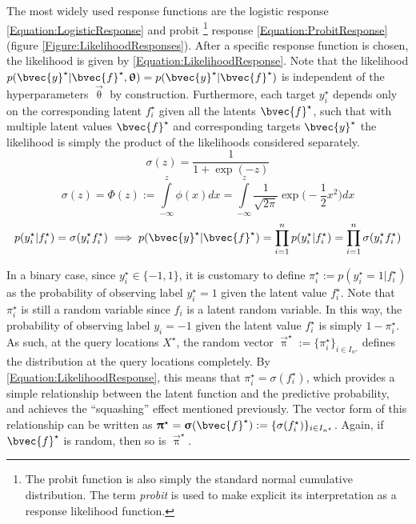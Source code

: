 				The most widely used response functions are the logistic response \eqref{Equation:LogisticResponse} and probit \footnote{The probit function is also simply the standard normal cumulative distribution. The term \textit{probit} is used to make explicit its interpretation as a response likelihood function.} response \eqref{Equation:ProbitResponse} (figure \ref{Figure:LikelihoodResponses}). After a specific response function is chosen, the likelihood is given by \eqref{Equation:LikelihoodResponse}. Note that the likelihood $p(\bvec{y}^{\star} | \bvec{f}^{\star}, \vec{\uptheta}) = p(\bvec{y}^{\star} | \bvec{f}^{\star})$ is independent of the hyperparameters $\vec{\uptheta}$ by construction. Furthermore, each target $y^{\star}_{i}$ depends only on the corresponding latent $f^{\star}_{i}$ given all the latents $\bvec{f}^{\star}$, such that with multiple latent values $\bvec{f}^{\star}$ and corresponding targets $\bvec{y}^{\star}$ the likelihood is simply the product of the likelihoods considered separately. \begin{equation}
					\sigma(z) = \frac{1}{1 + \exp(-z)}
				\label{Equation:LogisticResponse}
				\end{equation} \begin{equation}
					\sigma(z) = \Phi(z) := \int\limits_{-\infty}^{z} \phi(x) dx =  \int\limits_{-\infty}^{z} \frac{1}{\sqrt{2 \pi}} \exp\Big(- \frac{1}{2} x^{2}\Big) dx
				\label{Equation:ProbitResponse}
				\end{equation} \begin{equation}
					p(y^{\star}_{i} | f^{\star}_{i}) = \sigma(y^{\star}_{i} f^{\star}_{i}) \implies p(\bvec{y}^{\star} | \bvec{f}^{\star}) = \prod_{i = 1}^{n} p(y^{\star}_{i} | f^{\star}_{i}) = \prod_{i = 1}^{n} \sigma(y^{\star}_{i} f^{\star}_{i})
				\label{Equation:LikelihoodResponse}
				\end{equation}				
				
				In a binary case, since $y^{\star}_{i} \in \{-1, 1\}$, it is customary to define $\pi^{\star}_{i} := p(y^{\star}_{i} = 1 | f^{\star}_{i})$ as the probability of observing label $y^{\star}_{i} = 1$ given the latent value $f^{\star}_{i}$. Note that $\pi^{\star}_{i}$ is still a random variable since $f_{i}$ is a latent random variable. In this way, the probability of observing label $y_{i} = -1$ given the latent value $f^{\star}_{i}$ is simply $1 - \pi^{\star}_{i}$. As such, at the query locations $X^{\star}$, the random vector $\vec{\uppi}^{\star} := \{\pi^{\star}_{i}\}_{i \in I_{n^{\star}}}$ defines the distribution at the query locations completely. By \eqref{Equation:LikelihoodResponse}, this means that $\pi^{\star}_{i} = \sigma(f^{\star}_{i})$, which provides a simple relationship between the latent function and the predictive probability, and achieves the ``squashing'' effect mentioned previously. The vector form of this relationship can be written as $\vec{\uppi}^{\star} = \vec{\upsigma}(\bvec{f}^{\star}) := \{\sigma(f^{\star}_{i})\}_{i \in I_{n^{\star}}}$. Again, if $\bvec{f}^{\star}$ is random, then so is $\vec{\uppi}^{\star}$.
				
